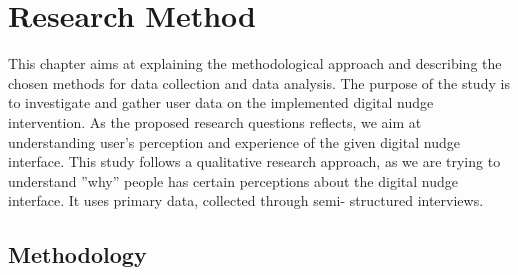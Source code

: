 \chapter{Research Method}
This chapter aims at explaining the methodological approach and describing the chosen methods for data collection and data analysis. The purpose of the study is to investigate and gather user data on the implemented digital nudge intervention. As the proposed research questions reflects, we aim at understanding user's perception and experience of the given digital nudge interface. %
This study follows a qualitative research approach, as we are trying to understand ”why” people has certain perceptions about the digital nudge interface. It uses primary data, collected through semi- structured interviews. 


\section{Methodology}



